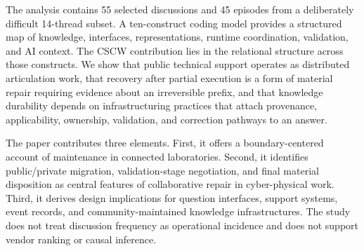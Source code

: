 The analysis contains 55 selected discussions and 45 episodes from a deliberately difficult 14-thread subset. A ten-construct coding model provides a structured map of knowledge, interfaces, representations, runtime coordination, validation, and AI context. The CSCW contribution lies in the relational structure across those constructs. We show that public technical support operates as distributed articulation work, that recovery after partial execution is a form of material repair requiring evidence about an irreversible prefix, and that knowledge durability depends on infrastructuring practices that attach provenance, applicability, ownership, validation, and correction pathways to an answer.

The paper contributes three elements. First, it offers a boundary-centered account of maintenance in connected laboratories. Second, it identifies public/private migration, validation-stage negotiation, and final material disposition as central features of collaborative repair in cyber-physical work. Third, it derives design implications for question interfaces, support systems, event records, and community-maintained knowledge infrastructures. The study does not treat discussion frequency as operational incidence and does not support vendor ranking or causal inference.
